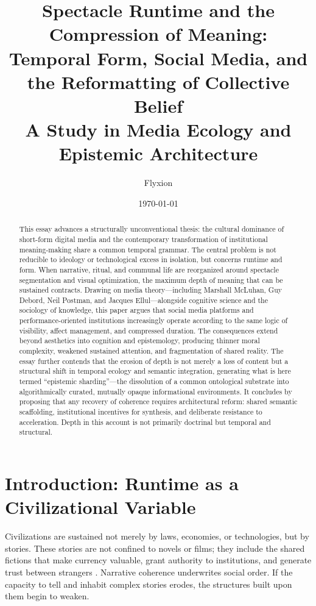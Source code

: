 \documentclass[12pt]{article}
\title{\textbf{Spectacle Runtime and the Compression of Meaning:\\
Temporal Form, Social Media, and the Reformatting of Collective Belief}\\[0.5em]
\large A Study in Media Ecology and Epistemic Architecture}
\author{Flyxion}
\date{\today}
\begin{document}
\maketitle

\begin{abstract}
This essay advances a structurally unconventional thesis: the cultural dominance of short-form digital media and the contemporary transformation of institutional meaning-making share a common temporal grammar. The central problem is not reducible to ideology or technological excess in isolation, but concerns runtime and form. When narrative, ritual, and communal life are reorganized around spectacle segmentation and visual optimization, the maximum depth of meaning that can be sustained contracts. Drawing on media theory---including Marshall McLuhan, Guy Debord, Neil Postman, and Jacques Ellul---alongside cognitive science and the sociology of knowledge, this paper argues that social media platforms and performance-oriented institutions increasingly operate according to the same logic of visibility, affect management, and compressed duration. The consequences extend beyond aesthetics into cognition and epistemology, producing thinner moral complexity, weakened sustained attention, and fragmentation of shared reality. The essay further contends that the erosion of depth is not merely a loss of content but a structural shift in temporal ecology and semantic integration, generating what is here termed ``epistemic sharding''---the dissolution of a common ontological substrate into algorithmically curated, mutually opaque informational environments. It concludes by proposing that any recovery of coherence requires architectural reform: shared semantic scaffolding, institutional incentives for synthesis, and deliberate resistance to acceleration. Depth in this account is not primarily doctrinal but temporal and structural.
\end{abstract}

\newpage
\tableofcontents
\newpage

\section{Introduction: Runtime as a Civilizational Variable}

Civilizations are sustained not merely by laws, economies, or technologies, but by stories. These stories are not confined to novels or films; they include the shared fictions that make currency valuable, grant authority to institutions, and generate trust between strangers \citep{Harari2015}. Narrative coherence underwrites social order. If the capacity to tell and inhabit complex stories erodes, the structures built upon them begin to weaken.
\end{document}
